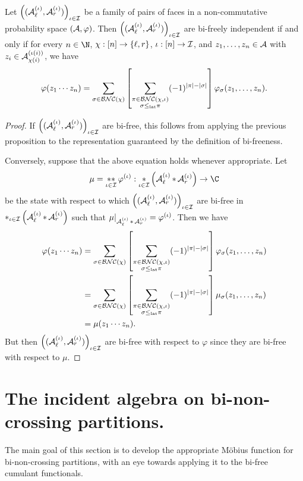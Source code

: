 \begin{corollary}
	\label{cor:bifreelats}
	Let $\left((\mathcal{A}_\ell^{(\iota)}, \mathcal{A}_r^{(\iota)})\right)_{\iota\in\mathcal{I}}$ be a family of pairs of faces in a non-commutative probability space $(\mathcal{A}, \varphi)$.
	Then $\left((\mathcal{A}_\ell^{(\iota)}, \mathcal{A}_r^{(\iota)})\right)_{\iota\in\mathcal{I}}$ are bi-freely independent if and only if for every $n \in \N$, $\chi : [n] \to \left\{\ell, r\right\}$, $\iota : [n] \to \mathcal{I}$, and $z_1, \ldots, z_n \in \mathcal{A}$ with $z_i \in \mathcal{A}_{\chi(i)}^{(\iota(i))}$, we have
	$$\varphi(z_1\cdots z_n)
	= \sum_{\sigma \in \mathcal{BNC}(\chi)}\left[\sum_{\substack{\pi \in \mathcal{BNC}(\chi, \iota) \\ \sigma \leq_{{\operatorname{lat}}} \pi}} (-1)^{\left|\pi\right| - \left|\sigma\right|}\right] \varphi_\sigma(z_1, \ldots, z_n).$$
\end{corollary}

\begin{proof}
	If $\left((\mathcal{A}_\ell^{(\iota)}, \mathcal{A}_r^{(\iota)})\right)_{\iota\in\mathcal{I}}$ are bi-free, this follows from applying the previous proposition to the representation guaranteed by the definition of bi-freeness.

	Conversely, suppose that the above equation holds whenever appropriate.
	Let
	$$\mu = \stst_{\iota\in\I}\varphi^{(\iota)} : \st_{\iota\in\I} \paren{\A_{\ell}^{(\iota)} \st \A_r^{(\iota)}} \to \C$$
	be the state with respect to which $\left((\mathcal{A}_\ell^{(\iota)}, \mathcal{A}_r^{(\iota)})\right)_{\iota\in\mathcal{I}}$ are bi-free in $\mathop{\ast}_{\iota\in\mathcal{I}}\left(\mathcal{A}_{\ell}^{(\iota)} \mathop{\ast} \mathcal{A}_r^{(\iota)}\right)$ such that $\mu|_{\mathcal{A}_\ell^{(\iota)}\mathop{\ast}\mathcal{A}_r^{(\iota)}} = \varphi^{(\iota)}$.
	Then we have
	\begin{align*}
		\varphi(z_1\cdots z_n)
		&= \sum_{\sigma \in \mathcal{BNC}(\chi)}\left[\sum_{\substack{\pi \in \mathcal{BNC}(\chi, \iota) \\ \sigma \leq_{{\operatorname{lat}}} \pi}} (-1)^{\left|\pi\right| - \left|\sigma\right|}\right] \varphi_\sigma(z_1, \ldots, z_n) \\
		&= \sum_{\sigma \in \mathcal{BNC}(\chi)}\left[\sum_{\substack{\pi \in \mathcal{BNC}(\chi, \iota) \\ \sigma \leq_{{\operatorname{lat}}} \pi}} (-1)^{\left|\pi\right| - \left|\sigma\right|}\right] \mu_\sigma(z_1, \ldots, z_n) \\
		&= \mu(z_1\cdots z_n).
	\end{align*}
	But then $\left((\mathcal{A}_\ell^{(\iota)}, \mathcal{A}_r^{(\iota)})\right)_{\iota\in\mathcal{I}}$ are bi-free with respect to $\varphi$ since they are bi-free with respect to $\mu$.
\end{proof}



\section{The incident algebra on bi-non-crossing partitions.}
The main goal of this section is to develop the appropriate M\"obius function for bi-non-crossing partitions, with an eye towards applying it to the bi-free cumulant functionals.

